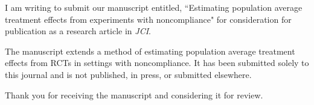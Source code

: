 \documentclass[10pt,stdletter,dateno]{newlfm}
\begin{document}
\begin{newlfm}

I am writing to submit our manuscript entitled, ``Estimating population average treatment effects from experiments with noncompliance" for consideration for publication as a research article in \textit{JCI}. 

The manuscript extends a method of estimating population average treatment effects from RCTs in settings with noncompliance. It has been submitted solely to this journal and is not published, in press, or submitted elsewhere.

Thank you for receiving the manuscript and considering it for review. 

\end{newlfm}
\end{document}
